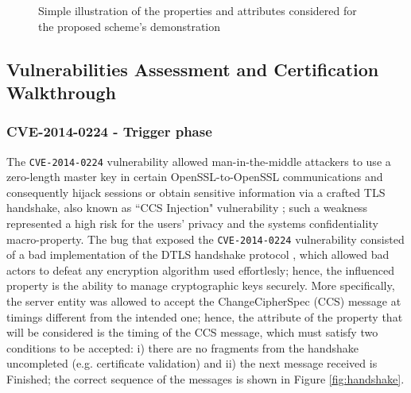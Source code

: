 \begin{figure}[ht]
    \centering
    \caption{Simple illustration of the properties and attributes considered for the proposed scheme's demonstration}
    \label{fig:proc_prop}
\end{figure}



\subsection{Vulnerabilities Assessment and Certification Walkthrough}
\subsubsection{CVE-2014-0224 - Trigger phase}
The \texttt{CVE-2014-0224} vulnerability allowed man-in-the-middle attackers \cite{conti2016survey} to use a zero-length master key in certain OpenSSL-to-OpenSSL communications and consequently hijack sessions or obtain sensitive information via a crafted TLS handshake, also known as ``CCS Injection" vulnerability \cite{CCS}; such a weakness represented a high risk for the users' privacy and the systems confidentiality macro-property.
The bug that exposed the \texttt{CVE-2014-0224} vulnerability consisted of a bad implementation of the DTLS handshake protocol \cite{DTLS}, which allowed bad actors to defeat any encryption algorithm used effortlesly; hence, the influenced property is the ability to manage cryptographic keys securely. More specifically, the server entity was allowed to accept the ChangeCipherSpec (CCS) message at timings different from the intended one; hence, the attribute of the property that will be considered is the timing of the CCS message, which must satisfy two conditions to be accepted: i) there are no fragments from the handshake uncompleted (e.g. certificate validation) and ii) the next message received is Finished; the correct sequence of the messages is shown in Figure \ref{fig:handshake}.

